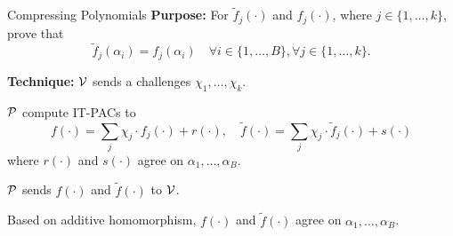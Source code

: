 \begin{frame}{Compressing Polynomials}
	\textbf{Purpose:} For $\tilde{f}_j(\cdot)$ and $f_j(\cdot)$, where $j \in \{1, \dots, k\}$, prove that 
	\begin{equation*}
		\tilde{f}_j(\alpha_i) = f_j(\alpha_i) \quad \forall i \in \{1, \dots, B\}, \forall j \in \{1,\dots, k\}. 
	\end{equation*}

	\textbf{Technique:} $\mathcal{V}$ sends a challenges $\chi_1, \dots, \chi_k$.
	
	$\mathcal{P}$ compute IT-PACs to $$f(\cdot) = \sum_j \chi_j \cdot f_j(\cdot) + r(\cdot), \quad\tilde{f}(\cdot) = \sum_j \chi_j \cdot \tilde{f}_j(\cdot) + s(\cdot)$$
	where $r(\cdot)$ and $s(\cdot)$ agree on $\alpha_1, \dots, \alpha_B$.
	
	$\mathcal{P}$ sends $f(\cdot)$ and $\tilde{f}(\cdot)$ to $\mathcal{V}$.
	
	Based on additive homomorphism, $f(\cdot)$ and $\tilde{f}(\cdot)$ agree on $\alpha_1, \dots, \alpha_B$.
\end{frame}